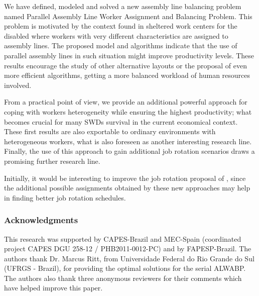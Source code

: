 \documentclass{singlecol-new}
\begin{document}
We have defined, modeled and solved a new assembly line balancing problem named Parallel Assembly Line Worker Assignment and Balancing Problem. This problem is motivated by the context found in sheltered work centers for the disabled where workers with very different characteristics are assigned to assembly lines. The proposed model and algorithms indicate that the use of parallel assembly lines in such situation might improve productivity levels. These results encourage the study of other alternative layouts or the proposal of even more efficient algorithms, getting a more balanced workload of human resources involved. 

From a practical point of view, we provide an additional powerful approach for coping with workers heterogeneity while ensuring the highest productivity; what becomes crucial for many SWDs survival in the current economical context. These first results are also exportable to ordinary environments with heterogeneous workers, what is also foreseen as another interesting research line. Finally, the use of this approach to gain additional job rotation scenarios draws a promising further research line.

Initially, it would be interesting to improve the job rotation proposal of \cite{costa09job}, since the additional possible assignments obtained by these new approaches may help in finding better job rotation schedules.

\subsubsection*{Acknowledgments}

This research was supported by CAPES-Brazil and MEC-Spain (coordinated project CAPES DGU 258-12 / PHB2011-0012-PC) and by FAPESP-Brazil. The authors thank Dr. Marcus Ritt, from Universidade Federal do Rio Grande do Sul (UFRGS - Brazil), for providing the optimal solutions for the serial ALWABP. The authors also thank three anonymous reviewers for their comments which have helped improve this paper.



\end{document}
